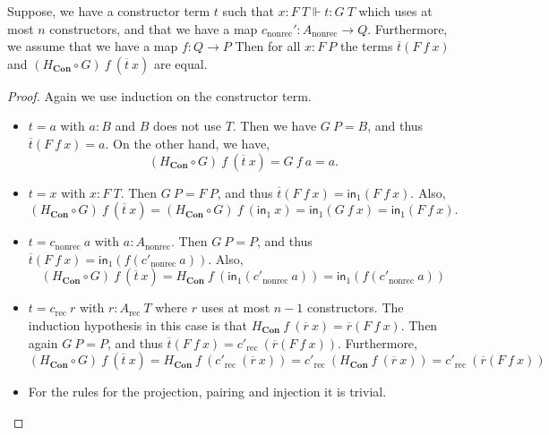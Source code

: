 \documentclass[a4paper,UKenglish]{lipics-v2016}
\newcommand{\Boperator}[1]{\mathsf{#1}}
\newcommand{\inn}{\Boperator{in}}
\newcommand{\rec}[0]{\operatorname{rec}}
\newcommand{\nonrec}[0]{\operatorname{nonrec}}
\newcommand{\Con}[0]{\textbf{Con}}
\begin{document}
\begin{lemma}
\label{lem:constrCoh}
Suppose, we have a constructor term $t$ such that $x : F \> T \Vdash t : G \> T$ which uses at most $n$ constructors, and that we have a map $c_{\nonrec}' : A_{\nonrec} \rightarrow Q$.
Furthermore, we assume that we have a map $f : Q \rightarrow P$
Then for all $x : F \> P$ the terms $\overline{t}(F \> f \> x)$ and $(H_{\Con} \circ G) \> f \> (\overline{t} \> x)$ are equal.
\end{lemma}

\begin{proof}
Again we use induction on the constructor term.
\begin{itemize}
        \item $t = a$ with $a : B$ and $B$ does not use $T$. 
        Then we have $G \> P = B$, and thus 
        $
        \overline{t}(F \> f \> x) = a.
        $
        On the other hand, we have, 
        \[
        (H_{\Con} \circ G) \> f \> (\overline{t} \> x) = G \> f \> a = a.
        \]
        \item $t = x$ with $x : F \> T$. 
        Then $G \> P = F \> P$, and thus
        $
        \overline{t}(F \> f \> x) = \inn_1(F \> f \> x).
        $
        Also,
        \[
        (H_{\Con} \circ G) \> f \> (\overline{t} \> x) = (H_{\Con} \circ G) \> f \> (\inn_1 \> x) = \inn_1(G \> f \> x) = \inn_1(F \> f \> x).
        \]
        \item $t = c_{\nonrec} \> a$ with $a : A_{\nonrec}$. 
        Then $G \> P = P$, and thus
        $
        \overline{t}(F \> f \> x) = \inn_1(f(c'_{\nonrec} \> a))
        $.
        Also,
        \[
        (H_{\Con} \circ G) \> f \> (\overline{t} \> x) = H_{\Con} \> f \> (\inn_1(c'_{\nonrec} \> a)) = \inn_1(f(c'_{\nonrec} \> a))
        \]
        \item $t = c_{\rec} \> r$ with $r : A_{\rec} \> T$ where $r$ uses at most $n-1$ constructors. 
        The induction hypothesis in this case is that $H_{\Con} \> f \> (\overline{r} \> x) = \overline{r}(F \> f \> x)$.
        Then again $G \> P = P$, and thus
        $
        \overline{t}(F \> f \> x) = c'_{\rec} \> (\overline{r}(F \> f \> x))
        $.
        Furthermore,
        \[
        (H_{\Con} \circ G) \> f \> (\overline{t} \> x) = H_{\Con} \> f \> (c'_{\rec} \> (\overline{r} \> x)) = c'_{\rec} \> (H_{\Con} \> f \> (\overline{r} \> x)) = c'_{\rec} \> (\overline{r}(F \> f \> x))
        \]
        \item For the rules for the projection, pairing and injection it is trivial. \qedhere
\end{itemize}
\end{proof}
\end{document}
